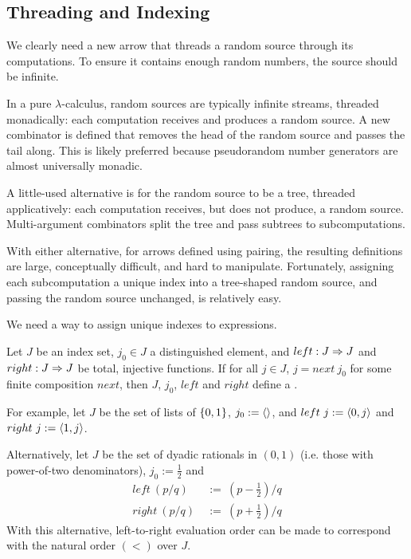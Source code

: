 \documentclass[preprint]{sigplanconf}
\begin{document}
\subsection{Threading and Indexing}

We clearly need a new arrow that threads a random source through its computations.
To ensure it contains enough random numbers, the source should be infinite.

In a pure $\lambda$-calculus, random sources are typically infinite streams, threaded monadically: each computation receives and produces a random source.
A new combinator is defined that removes the head of the random source and passes the tail along.
This is likely preferred because pseudorandom number generators are almost universally monadic.

A little-used alternative is for the random source to be a tree, threaded applicatively:
each computation receives, but does not produce, a random source.
Multi-argument combinators split the tree and pass subtrees to subcomputations.

With either alternative, for arrows defined using pairing, the resulting definitions are large, conceptually difficult, and hard to manipulate.
Fortunately, assigning each subcomputation a unique index into a tree-shaped random source, and passing the random source unchanged, is relatively easy.

We need a way to assign unique indexes to expressions.

\begin{definition}
Let $J$ be an index set, $j_0 \in J$ a distinguished element, and $left : J \Rightarrow J$ and $right : J \Rightarrow J$ be total, injective functions. If for all $j \in J$, $j = next~j_0$ for some finite composition $next$, then $J$, $j_0$, $left$ and $right$ define a .
\end{definition}

For example, let $J$ be the set of lists of $\{{0,1}\}$, $j_0 := \langle{}\rangle$, and $left~j := \langle{0,j}\rangle$ and $right~j := \langle{1,j}\rangle$.

Alternatively, let $J$ be the set of dyadic rationals in $(0,1)$ (i.e. those with power-of-two denominators), $j_0 := \tfrac{1}{2}$ and
\begin{equation}
\begin{aligned}
	left~(p/q) &\ := \ (p-\tfrac{1}{2})/q
\\
	right~(p/q) &\ := \ (p+\tfrac{1}{2})/q
\end{aligned}
\end{equation}
With this alternative, left-to-right evaluation order can be made to correspond with the natural order $(<)$ over $J$.
\end{document}
